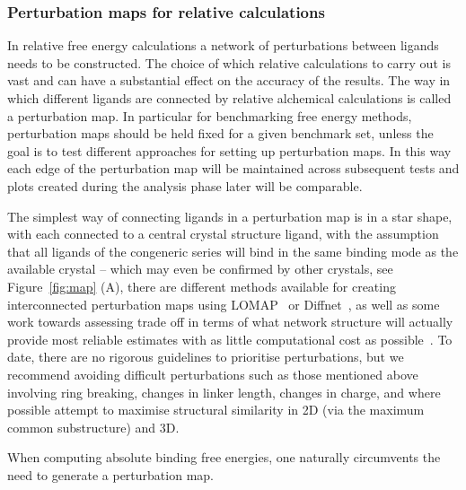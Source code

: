 \documentclass[9pt,bestpractices]{livecoms}
\begin{document}
\subsubsection{Perturbation maps for relative calculations}
In relative free energy calculations a network of perturbations between ligands needs to be constructed. The choice of which relative calculations to carry out is vast and can have a substantial effect on the accuracy of the results. The way in which different ligands are connected by relative alchemical calculations is called a perturbation map. In particular for benchmarking free energy methods, perturbation maps should be held fixed for a given benchmark set, unless the goal is to test different approaches for setting up perturbation maps. In this way each edge of the perturbation map will be maintained across subsequent tests and plots created during the analysis phase later will be comparable. 

The simplest way of connecting ligands in a perturbation map is in a star shape, with each connected to a central crystal structure ligand, with the assumption that all ligands of the congeneric series will bind in the same binding mode as the available crystal -- which may even be confirmed by other crystals, see Figure~\ref{fig:map} (A), there are different methods available for creating interconnected perturbation maps using LOMAP~\cite{liu_lead_2013} or Diffnet~\cite{xu_optimal_2019}, as well as some work towards assessing trade off in terms of what network structure will actually provide most reliable estimates with as little computational cost as possible~\cite{yang_optimal_2020, xu_optimal_2019}. To date, there are no rigorous guidelines to prioritise perturbations, but we recommend avoiding difficult perturbations such as those mentioned above involving ring breaking, changes in linker length, changes in charge, and where possible attempt to maximise structural similarity in 2D (via the maximum common substructure) and 3D.

When computing absolute binding free energies, one naturally circumvents the need to generate a perturbation map.
\end{document}
